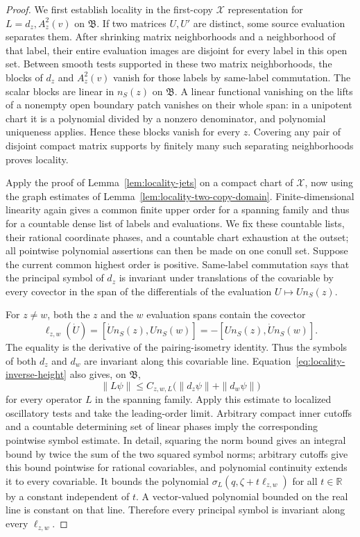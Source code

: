 \begin{proof}
We first establish locality in the first-copy $\mathcal X$
representation for $L=d_z,A_z^2(v)$ on $\mathfrak B$.  If two
matrices $U,U'$ are distinct, some source evaluation separates
them.  After shrinking matrix neighborhoods and a neighborhood of
that label, their entire evaluation images are disjoint for every
label in this open set.  Between smooth tests supported in these
two matrix neighborhoods, the blocks of $d_z$ and $A_z^2(v)$ vanish
for those labels by same-label commutation.  The scalar blocks are
linear in $n_S(z)$ on $\mathfrak B$.  A linear functional vanishing
on the lifts of a nonempty open boundary patch vanishes on their
whole span: in a unipotent chart it is a polynomial divided by a
nonzero denominator, and polynomial uniqueness applies.  Hence
these blocks vanish for every $z$.  Covering any pair of disjoint
compact matrix supports by finitely many such separating
neighborhoods proves locality.

Apply the proof of Lemma~\ref{lem:locality-jets} on a compact chart
of $\mathcal X$, now using the graph estimates of
Lemma~\ref{lem:locality-two-copy-domain}.  Finite-dimensional
linearity again gives a common finite upper order for a spanning
family and thus for a countable dense list of labels and
evaluations. We fix these countable lists, their rational coordinate
phases, and a countable chart exhaustion at the outset; all pointwise
polynomial assertions can then be made on one conull set. Suppose the
current common highest order is positive.
Same-label commutation says that the principal symbol of $d_z$ is
invariant under translations of the covariable by every covector
in the span of the differentials of the evaluation $U\mapsto
U n_S(z)$.

For $z\ne w$, both the $z$ and the $w$ evaluation spans contain
the covector
\begin{equation}
 \ell_{z,w}(\dot U)
 =[\dot U n_S(z),U n_S(w)]
 =-[U n_S(z),\dot U n_S(w)].
 \label{eq:locality-shared-covector}
\end{equation}
The equality is the derivative of the pairing-isometry identity.
Thus the symbols of both $d_z$ and $d_w$ are invariant along this
covariable line.  Equation~\eqref{eq:locality-inverse-height}
also gives, on $\mathfrak B$,
\[
 \|L\psi\|\le C_{z,w,L}
                 \big(\|d_z\psi\|+\|d_w\psi\|\big)
\]
for every operator $L$ in the spanning family.  Apply this estimate
to localized oscillatory tests and take the leading-order limit.
Arbitrary compact inner cutoffs and a countable determining set of
linear phases imply the corresponding pointwise symbol estimate. In detail, squaring
the norm bound gives an integral bound by twice the sum of the two
squared symbol norms; arbitrary cutoffs give this bound pointwise for
rational covariables, and polynomial continuity extends it to every
covariable. It bounds the polynomial $\sigma_L(q,\zeta+t\ell_{z,w})$ for all
$t\in\mathbb R$ by a constant independent of $t$.  A vector-valued
polynomial bounded on the real line is constant on that line.
Therefore every principal symbol is invariant along every
$\ell_{z,w}$.


\end{proof}
